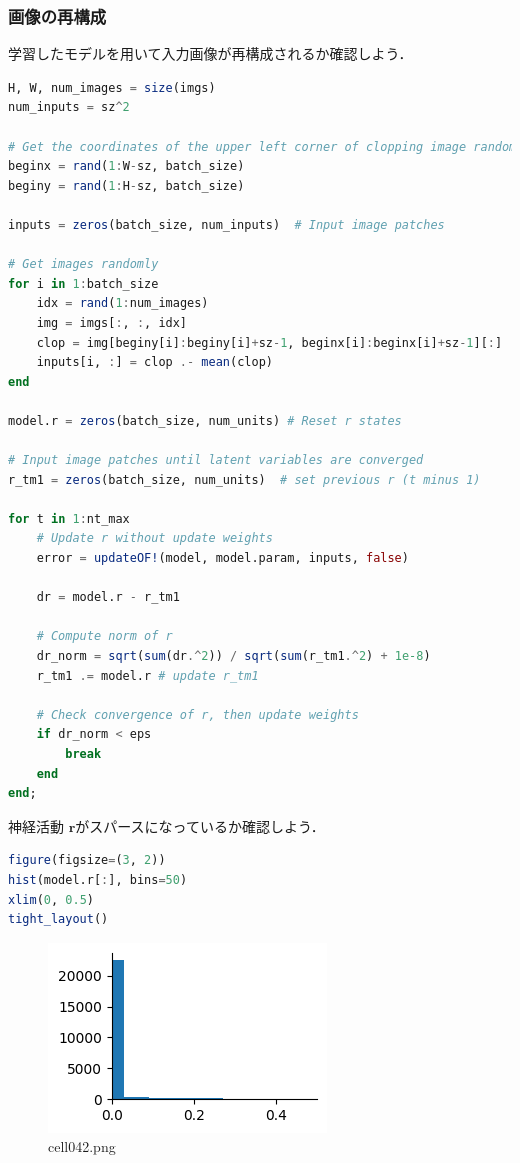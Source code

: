 \subsubsection{画像の再構成}
学習したモデルを用いて入力画像が再構成されるか確認しよう．
\begin{lstlisting}[language=julia]
H, W, num_images = size(imgs)
num_inputs = sz^2

# Get the coordinates of the upper left corner of clopping image randomly.
beginx = rand(1:W-sz, batch_size)
beginy = rand(1:H-sz, batch_size)

inputs = zeros(batch_size, num_inputs)  # Input image patches

# Get images randomly
for i in 1:batch_size        
    idx = rand(1:num_images)
    img = imgs[:, :, idx]
    clop = img[beginy[i]:beginy[i]+sz-1, beginx[i]:beginx[i]+sz-1][:]
    inputs[i, :] = clop .- mean(clop)
end

model.r = zeros(batch_size, num_units) # Reset r states

# Input image patches until latent variables are converged 
r_tm1 = zeros(batch_size, num_units)  # set previous r (t minus 1)

for t in 1:nt_max
    # Update r without update weights 
    error = updateOF!(model, model.param, inputs, false)

    dr = model.r - r_tm1 

    # Compute norm of r
    dr_norm = sqrt(sum(dr.^2)) / sqrt(sum(r_tm1.^2) + 1e-8)
    r_tm1 .= model.r # update r_tm1

    # Check convergence of r, then update weights
    if dr_norm < eps
        break
    end
end;
\end{lstlisting}
神経活動 $\mathbf{r}$がスパースになっているか確認しよう．
\begin{lstlisting}[language=julia]
figure(figsize=(3, 2))
hist(model.r[:], bins=50)
xlim(0, 0.5)
tight_layout()
\end{lstlisting}
\begin{figure}[ht]
	\centering
	\includegraphics[scale=0.8, max width=\linewidth]{./fig/energy-based-model/sparse-coding/cell042.png}
	\caption{cell042.png}
	\label{cell042.png}
\end{figure}
